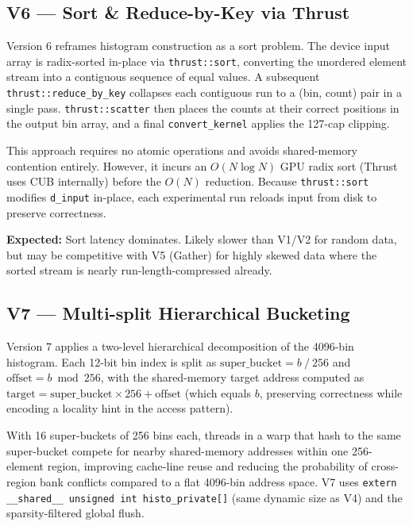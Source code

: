 \documentclass[11pt, letterpaper]{article}
\begin{document}
\subsection*{V6 — Sort \& Reduce-by-Key via Thrust}

Version 6 reframes histogram construction as a sort problem.
The device input array is radix-sorted in-place via
\texttt{thrust::sort}, converting the unordered element stream into a
contiguous sequence of equal values.  A subsequent
\texttt{thrust::reduce\_by\_key} collapses each contiguous run to a
(bin, count) pair in a single pass.
\texttt{thrust::scatter} then places the counts at their correct positions
in the output bin array, and a final \texttt{convert\_kernel} applies the
127-cap clipping.

This approach requires no atomic operations and avoids shared-memory
contention entirely.  However, it incurs an $O(N \log N)$ GPU radix sort
(Thrust uses CUB internally) before the $O(N)$ reduction.
Because \texttt{thrust::sort} modifies \texttt{d\_input} in-place, each
experimental run reloads input from disk to preserve correctness.

\textbf{Expected:} Sort latency dominates.  Likely slower than V1/V2
for random data, but may be competitive with V5 (Gather) for highly skewed
data where the sorted stream is nearly run-length-compressed already.

\subsection*{V7 — Multi-split Hierarchical Bucketing}

Version 7 applies a two-level hierarchical decomposition of the 4096-bin
histogram.  Each 12-bit bin index is split as
$\text{super\_bucket} = b \mathbin{/} 256$ and $\text{offset} = b \bmod 256$,
with the shared-memory target address computed as
$\text{target} = \text{super\_bucket} \times 256 + \text{offset}$
(which equals $b$, preserving correctness while encoding a locality hint in
the access pattern).

With 16 super-buckets of 256 bins each, threads in a warp that hash to the
same super-bucket compete for nearby shared-memory addresses within one
256-element region, improving cache-line reuse and reducing the probability
of cross-region bank conflicts compared to a flat 4096-bin address space.
V7 uses \texttt{extern \_\_shared\_\_ unsigned int histo\_private[]} (same
dynamic size as V4) and the sparsity-filtered global flush.
\end{document}
